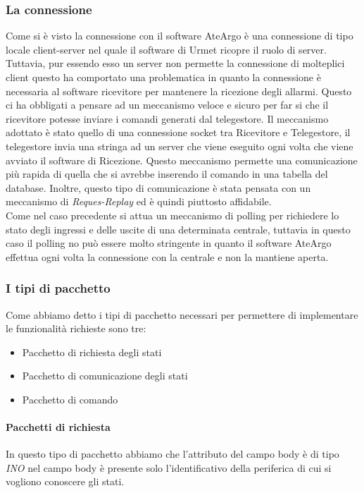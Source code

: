 \subsubsection{La connessione}
Come si è visto la connessione con il software AteArgo è una connessione di tipo locale client-server nel quale il software di Urmet ricopre il ruolo di server. Tuttavia, pur essendo esso un server non permette la connessione di molteplici client questo ha comportato una problematica in quanto la connessione è necessaria al software ricevitore per mantenere la ricezione degli allarmi. Questo ci ha obbligati a pensare ad un meccanismo veloce e sicuro per far si che il ricevitore potesse inviare i comandi generati dal telegestore. Il meccanismo adottato è stato quello di una connessione socket tra Ricevitore e Telegestore, il telegestore invia una stringa ad un server che viene eseguito ogni volta che viene avviato il software di Ricezione. Questo meccanismo permette una comunicazione più rapida di quella che si avrebbe inserendo il comando in una tabella del database. 
Inoltre, questo tipo di comunicazione è stata pensata con un meccanismo di \emph{Reques-Replay} ed è quindi piuttosto affidabile.\\
Come nel caso precedente si attua un meccanismo di polling per richiedere lo stato degli ingressi e delle uscite di una determinata centrale, tuttavia in questo caso il polling no può essere molto stringente in quanto il software AteArgo effettua ogni volta la connessione con la centrale e non la mantiene aperta.
\subsubsection{I tipi di pacchetto}
Come abbiamo detto i tipi di pacchetto necessari per permettere di implementare le funzionalità richieste sono tre:
\begin{itemize}
	\item Pacchetto di richiesta degli stati
	\item Pacchetto di comunicazione degli stati
	\item Pacchetto di comando
\end{itemize}
\paragraph{Pacchetti di richiesta}
In questo tipo di pacchetto abbiamo che l'attributo del campo body è di tipo \emph{INO} nel campo body è presente solo l'identificativo della periferica di cui si vogliono conoscere gli stati.
